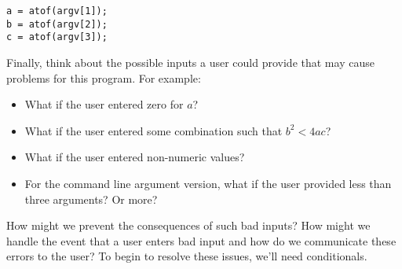 \begin{verbatim}
a = atof(argv[1]);
b = atof(argv[2]);
c = atof(argv[3]);
\end{verbatim}

Finally, think about the possible inputs a user could provide that may cause problems
for this program.  For example:
\begin{itemize}
  \item What if the user entered zero for $a$?
  \item What if the user entered some combination such that $b^2 < 4ac$?
  \item What if the user entered non-numeric values?
  \item For the command line argument version, what if the user provided 
  	less than three arguments?  Or more?
\end{itemize}
How might we prevent the consequences of such bad inputs?   
How might we handle the event that a user enters bad input and
how do we communicate these errors to the user?  To begin to 
resolve these issues, we'll need conditionals.




